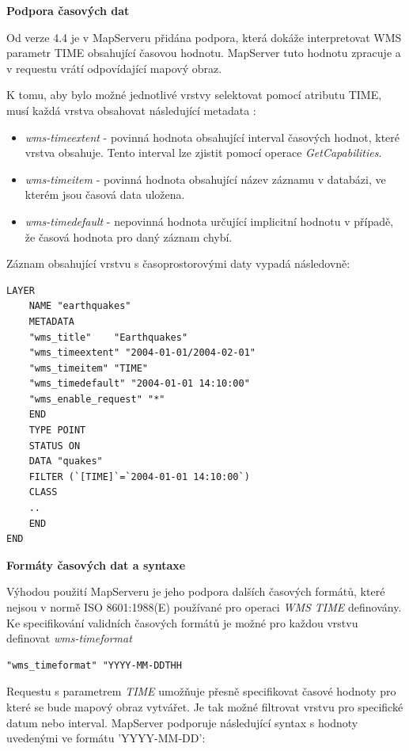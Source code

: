 \bigskip
\noindent
\textbf{Podpora časových dat}

Od verze 4.4 je v MapServeru přidána podpora, která dokáže
interpretovat WMS parametr TIME obsahující časovou hodnotu. MapServer
tuto hodnotu zpracuje a v requestu vrátí odpovídající mapový obraz.

K tomu, aby bylo možné jednotlivé vrstvy selektovat pomocí atributu
TIME, musí každá vrstva obsahovat následující metadata
\cite{mapserver_about}:

\begin{itemize}
\item\textit{wms-timeextent} - povinná hodnota obsahující interval
  časových hodnot, které vrstva obsahuje. Tento interval lze zjistit
  pomocí operace \textit{GetCapabilities}.
\item\textit{wms-timeitem} - povinná hodnota obsahující název záznamu
  v databázi, ve kterém jsou časová data uložena.
\item\textit{wms-timedefault} - nepovinná hodnota určující implicitní
  hodnotu v případě, že časová hodnota pro daný záznam chybí.
\end{itemize}

\noindent
Záznam obsahující vrstvu s časoprostorovými daty vypadá následovně:

\begin{verbatim}
LAYER
	NAME "earthquakes"
	METADATA
	"wms_title"    "Earthquakes"
	"wms_timeextent" "2004-01-01/2004-02-01"
	"wms_timeitem" "TIME"
	"wms_timedefault" "2004-01-01 14:10:00"
	"wms_enable_request" "*"
	END
	TYPE POINT
	STATUS ON
	DATA "quakes"
	FILTER (`[TIME]`=`2004-01-01 14:10:00`)
	CLASS
	..
	END
END
\end{verbatim}

\bigskip
\noindent
\textbf{Formáty časových dat a syntaxe}

Výhodou použití MapServeru je jeho podpora dalších časových formátů,
které nejsou v normě ISO 8601:1988(E) používané pro operaci
\textit{WMS TIME} definovány. Ke specifikování validních časových
formátů je možné pro každou vrstvu definovat \textit{wms-timeformat}

\begin{verbatim}
"wms_timeformat" "YYYY-MM-DDTHH
\end{verbatim}

Requestu s parametrem \textit{TIME} umožňuje přesně specifikovat
časové hodnoty pro které se bude mapový obraz vytvářet. Je tak možné
filtrovat vrstvu pro specifické datum nebo interval. MapServer
podporuje následující syntax s hodnoty uvedenými ve formátu
'YYYY-MM-DD':

